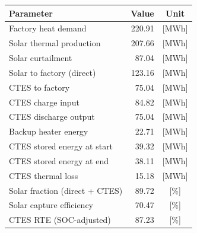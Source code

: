 \renewcommand{\arraystretch}{1.2}
\begin{table}[h]
\centering
\begin{tabular}{l|r c}
\hline
Parameter & Value & Unit \\
\hline
Factory heat demand & 220.91 & [MWh] \\
Solar thermal production & 207.66 & [MWh] \\
Solar curtailment & 87.04 & [MWh] \\
Solar to factory (direct) & 123.16 & [MWh] \\
CTES to factory & 75.04 & [MWh] \\
CTES charge input & 84.82 & [MWh] \\
CTES discharge output & 75.04 & [MWh] \\
Backup heater energy & 22.71 & [MWh] \\
CTES stored energy at start & 39.32 & [MWh] \\
CTES stored energy at end & 38.11 & [MWh] \\
CTES thermal loss & 15.18 & [MWh] \\
\hline
Solar fraction (direct + CTES) & 89.72 & [\%] \\
Solar capture efficiency & 70.47 & [\%] \\
CTES RTE (SOC-adjusted) & 87.23 & [\%] \\
\hline
\end{tabular}
\end{table}
